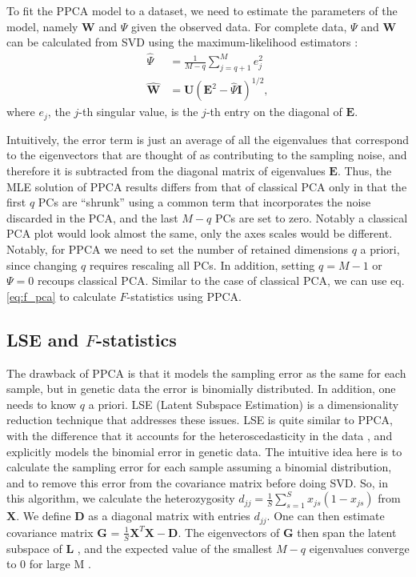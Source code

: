 \documentclass[12pt]{article}
\newcommand{\BI}{\mathbf{I}}
\newcommand{\MX}{\mathbf{X}}
\newcommand{\MG}{\mathbf{G}}
\begin{document}
To fit the PPCA model to a dataset, we need to estimate the parameters of the model, namely $\mathbf{W}$ and $\Psi$ given the observed data. For complete data, $\Psi$ and $\mathbf{W}$ can be calculated from SVD using the maximum-likelihood estimators \citep{tipping_probabilistic_1999}:
\begin{align*}
    \hat{\Psi} &= \frac{1}{M-q}\sum_{j=q+1}^M e_{j}^2\\
    \hat{\mathbf{W}} &= \mathbf{U}(\mathbf{E}^2 - \hat{\Psi}\BI)^{1/2},
\end{align*}
where $e_j$, the $j$-th singular value, is the $j$-th entry on the diagonal of $\mathbf{E}$.

Intuitively, the error term is just an average of all the eigenvalues that correspond to the eigenvectors that are thought of as contributing to the sampling noise, and therefore it is subtracted from the diagonal matrix of eigenvalues $\mathbf{E}$. Thus, the MLE solution of PPCA results differs from that of classical PCA only in that the first $q$ PCs are ``shrunk'' using a common term that incorporates the noise discarded in the PCA, and the last $M-q$ PCs are set to zero. Notably a classical PCA plot would look almost the same, only the axes scales would be different. Notably, for PPCA we need to set the number of retained dimensions $q$ a priori, since changing $q$ requires rescaling all PCs. In addition, setting $q=M-1$ or $\Psi=0$ recoups classical PCA. Similar to the case of classical PCA, we can use eq. \ref{eq:f_pca} to calculate $F$-statistics using PPCA.

\subsection{LSE and $F$-statistics}\label{theory-lse}
The drawback of PPCA is that it models the sampling error as the same for each sample, but in genetic data the error is binomially distributed. In addition, one needs to know $q$ a priori. LSE (Latent Subspace Estimation) is a dimensionality reduction technique that addresses these issues. LSE is quite similar to PPCA, with the difference that it accounts for the heteroscedasticity in the data \citep{chen_consistent_2015}, and explicitly models the binomial error in genetic data. The intuitive idea here is to calculate the sampling error for each sample assuming a binomial distribution, and to remove this error from the covariance matrix before doing SVD. So, in this algorithm, we calculate the heterozygosity  $d_{jj} = \frac{1}{S}\sum_{s=1}^S x_{js}(1 - x_{js})$ from $\MX$. We define $\mathbf{D}$ as a diagonal matrix with entries  $d_{jj}$. One can then estimate covariance matrix $\MG$ = $\frac{1}{S}\MX^T\MX - \mathbf{D}$. The eigenvectors of $\mathbf{G}$ then span the latent subspace of $\mathbf{L}$ , and the expected value of the smallest $M-q$ eigenvalues converge to 0 for large M \citep{cabreros_likelihood-free_2019}.
\end{document}
